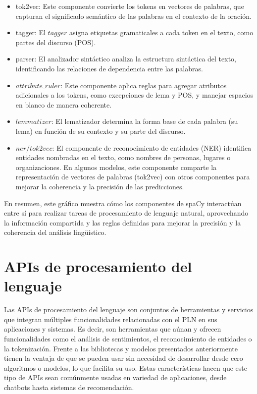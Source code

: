 \begin{itemize}
	\item tok2vec: Este componente convierte los tokens en vectores de palabras, que capturan el significado semántico de las palabras en el contexto de la oración.
	\item tagger: El $tagger$ asigna etiquetas gramaticales a cada token en el texto, como partes del discurso (POS).
	\item  parser: El analizador sintáctico analiza la estructura sintáctica del texto, identificando las relaciones de dependencia entre las palabras. 
	\item $attribute\_ruler$: Este componente aplica reglas para agregar atributos adicionales a los tokens, como excepciones de lema y POS, y manejar espacios en blanco de manera coherente.
	\item $lemmatizer$: El lematizador determina la forma base de cada palabra (su lema) en función de su contexto y su parte del discurso.
	\item $ner/tok2vec$: El componente de reconocimiento de entidades (NER) identifica entidades nombradas en el texto, como nombres de personas, lugares o organizaciones. En algunos modelos, este componente comparte la representación de vectores de palabras (tok2vec) con otros componentes para mejorar la coherencia y la precisión de las predicciones.
\end{itemize}

En resumen, este gráfico muestra cómo los componentes de spaCy interactúan entre sí para realizar tareas de procesamiento de lenguaje natural, aprovechando la información compartida y las reglas definidas para mejorar la precisión y la coherencia del análisis lingüístico.



\section{APIs de procesamiento del lenguaje}
\label{sec:apis}

Las APIs de procesamiento del lenguaje son conjuntos de herramientas y servicios que integran múltiples funcionalidades relacionadas con el PLN en sus aplicaciones y sistemas. Es decir, son herramientas que aúnan y ofrecen funcionalidades como el análisis de sentimientos, el reconocimiento de entidades o la tokenización. Frente a las bibliotecas y modelos presentados anteriormente tienen la ventaja de que se pueden usar sin necesidad de desarrollar desde cero algoritmos o modelos, lo que facilita su uso. Estas características hacen que este tipo de APIs sean comúnmente usadas en variedad de aplicaciones, desde chatbots hasta sistemas de recomendación. 

